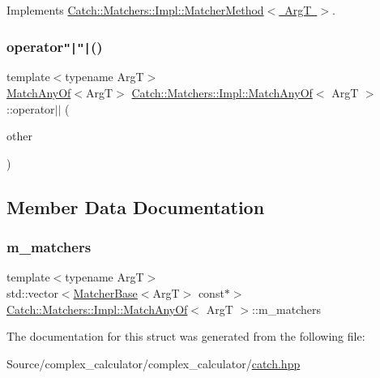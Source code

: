 Implements \mbox{\hyperlink{struct_catch_1_1_matchers_1_1_impl_1_1_matcher_method_ae0920ff9e817acf08e1bb0cbcb044e30}{Catch\+::\+Matchers\+::\+Impl\+::\+Matcher\+Method$<$ Arg\+T $>$}}.

\mbox{\label{struct_catch_1_1_matchers_1_1_impl_1_1_match_any_of_ab356d77b28b487c2d9fe8b1e1e6f78c9}} 
\subsubsection{\texorpdfstring{operator\texttt{"|}\texttt{"|}()}{operator||()}}
{\footnotesize\ttfamily template$<$typename ArgT$>$ \\
\mbox{\hyperlink{struct_catch_1_1_matchers_1_1_impl_1_1_match_any_of}{Match\+Any\+Of}}$<$ArgT$>$ \mbox{\hyperlink{struct_catch_1_1_matchers_1_1_impl_1_1_match_any_of}{Catch\+::\+Matchers\+::\+Impl\+::\+Match\+Any\+Of}}$<$ ArgT $>$\+::operator$\vert$$\vert$ (\begin{DoxyParamCaption}\item[{\mbox{\hyperlink{struct_catch_1_1_matchers_1_1_impl_1_1_matcher_base}{Matcher\+Base}}$<$ ArgT $>$ const \&}]{other }\end{DoxyParamCaption})\hspace{0.3cm}{\ttfamily [inline]}}



\subsection{Member Data Documentation}
\mbox{\label{struct_catch_1_1_matchers_1_1_impl_1_1_match_any_of_a1fb1119e6110dc15b8d5262ec0aeddd5}} 
\subsubsection{\texorpdfstring{m\+\_\+matchers}{m\_matchers}}
{\footnotesize\ttfamily template$<$typename ArgT$>$ \\
std\+::vector$<$\mbox{\hyperlink{struct_catch_1_1_matchers_1_1_impl_1_1_matcher_base}{Matcher\+Base}}$<$ArgT$>$ const$\ast$$>$ \mbox{\hyperlink{struct_catch_1_1_matchers_1_1_impl_1_1_match_any_of}{Catch\+::\+Matchers\+::\+Impl\+::\+Match\+Any\+Of}}$<$ ArgT $>$\+::m\+\_\+matchers}



The documentation for this struct was generated from the following file\+:\begin{DoxyCompactItemize}
\item 
Source/complex\+\_\+calculator/complex\+\_\+calculator/\mbox{\hyperlink{catch_8hpp}{catch.\+hpp}}\end{DoxyCompactItemize}
